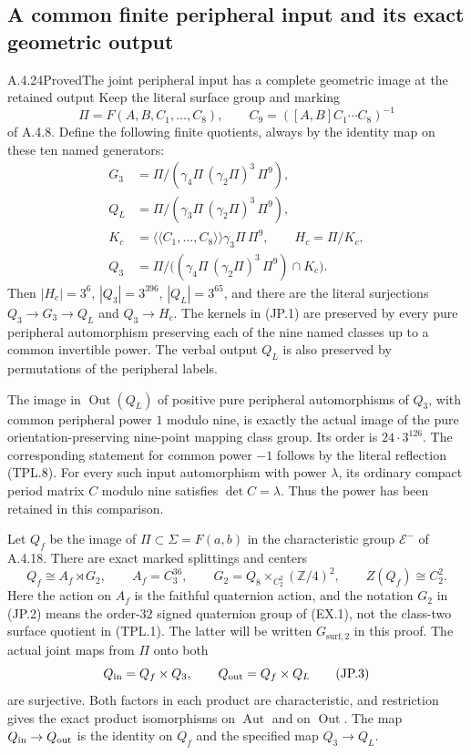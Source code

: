 \subsection{A common finite peripheral input and its exact geometric output}

\begin{result}{A.4.24}{Proved}{The joint peripheral input has a complete geometric image at the retained output}
Keep the literal surface group and marking
\[
 \Pi=F(A,B,C_1,\ldots,C_8),\qquad
 C_9=([A,B]C_1\cdots C_8)^{-1}
\]
of A.4.8.  Define the following finite quotients, always by the
identity map on these ten named generators:
\[
\begin{aligned}
 G_3&=\Pi/(\gamma_4\Pi\,(\gamma_2\Pi)^3\,\Pi^9),\\
 Q_L&=\Pi/(\gamma_3\Pi\,(\gamma_2\Pi)^3\,\Pi^9),\\
 K_c&=\langle\!\langle C_1,\ldots,C_8\rangle\!\rangle
          \gamma_3\Pi\,\Pi^9,\qquad H_c=\Pi/K_c,\\
 Q_3&=\Pi/\bigl((\gamma_4\Pi\,(\gamma_2\Pi)^3\,\Pi^9)
                         \cap K_c\bigr).
\end{aligned}                                                    \tag{JP.1}
\]
Then $|H_c|=3^6$, $|Q_3|=3^{396}$, $|Q_L|=3^{65}$, and there
are the literal surjections $Q_3\to G_3\to Q_L$ and $Q_3\to H_c$.
The kernels in (JP.1) are preserved by every pure peripheral
automorphism preserving each of the nine named classes up to a
common invertible power.  The verbal output $Q_L$ is also preserved
by permutations of the peripheral labels.

The image in $\operatorname{Out}(Q_L)$ of positive pure peripheral
automorphisms of $Q_3$, with common peripheral power $1$ modulo nine,
is exactly the actual image of the pure orientation-preserving
nine-point mapping class group.  Its order is
$24\cdot3^{126}$.  The corresponding statement for common power
$-1$ follows by the literal reflection (TPL.8).  For every such
input automorphism with power $\lambda$, its ordinary compact
period matrix $C$ modulo nine satisfies $\det C=\lambda$.
Thus the power has been retained in this comparison.

Let $Q_f$ be the image of $\Pi\subset\Sigma=F(a,b)$ in the
characteristic group $\mathcal E^-$ of A.4.18.  There are exact
marked splittings and centers
\[
 Q_f\cong A_f\rtimes G_2,\qquad A_f=C_3^{36},\qquad
 G_2=Q_8\mathbin{\times}_{C_2^2}(\mathbb Z/4)^2,
 \qquad Z(Q_f)\cong C_2^2.                              \tag{JP.2}
\]
Here the action on $A_f$ is the faithful quaternion action, and
the notation $G_2$ in (JP.2) means the order-$32$ signed quaternion
group of (EX.1), not the class-two surface quotient in (TPL.1).
The latter will be written $G_{\mathrm{surf},2}$ in this proof.
The actual joint maps from $\Pi$ onto both
\[
 Q_{\rm in}=Q_f\times Q_3,
 \qquad Q_{\rm out}=Q_f\times Q_L                         \tag{JP.3}
\]
are surjective.  Both factors in each product are characteristic,
and restriction gives the exact product isomorphisms on
$\operatorname{Aut}$ and on $\operatorname{Out}$.  The map
$Q_{\rm in}\to Q_{\rm out}$ is the identity on $Q_f$ and the
specified map $Q_3\to Q_L$.


\end{result}
